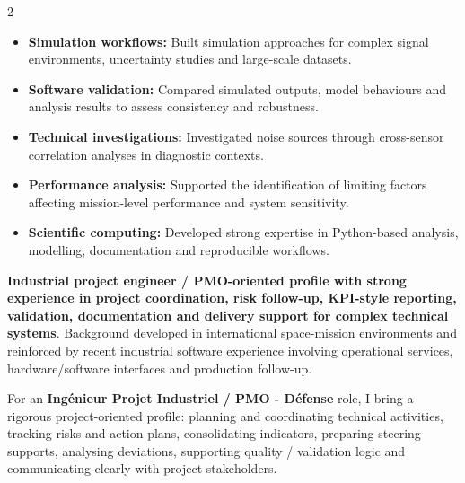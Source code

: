 \documentclass[8pt,a4paper,ragged2e,withhyper]{altacv}
\begin{document}
\begin{paracol}{2}
\begin{itemize}
  \item \textbf{Simulation workflows:} Built simulation approaches for complex signal environments, uncertainty studies and large-scale datasets.
  \item \textbf{Software validation:} Compared simulated outputs, model behaviours and analysis results to assess consistency and robustness.
  \item \textbf{Technical investigations:} Investigated noise sources through cross-sensor correlation analyses in diagnostic contexts.
  \item \textbf{Performance analysis:} Supported the identification of limiting factors affecting mission-level performance and system sensitivity.
  \item \textbf{Scientific computing:} Developed strong expertise in Python-based analysis, modelling, documentation and reproducible workflows.
\end{itemize}



\switchcolumn


\textbf{Industrial project engineer / PMO-oriented profile with strong experience in project coordination, risk follow-up, KPI-style reporting, validation, documentation and delivery support for complex technical systems}. Background developed in international space-mission environments and reinforced by recent industrial software experience involving operational services, hardware/software interfaces and production follow-up.

For an \textbf{Ingénieur Projet Industriel / PMO - Défense} role, I bring a rigorous project-oriented profile: planning and coordinating technical activities, tracking risks and action plans, consolidating indicators, preparing steering supports, analysing deviations, supporting quality / validation logic and communicating clearly with project stakeholders.


\end{paracol}
\end{document}
